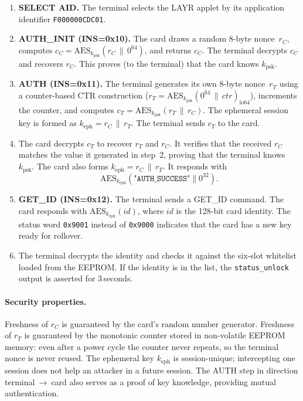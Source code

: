 \documentclass[manuscript,screen,nonacm]{acmart}
\begin{document}
\begin{enumerate}
  \item \textbf{SELECT AID.} The terminal selects the LAYR applet
        by its application identifier \texttt{F000000CDC01}.

  \item \textbf{AUTH\_INIT (INS=0x10).}
        The card draws a random 8-byte nonce~$r_C$, computes
        $c_C = \text{AES}_{k_\text{psk}}(r_C \,\|\, 0^{64})$, and
        returns $c_C$.
        The terminal decrypts $c_C$ and recovers $r_C$.
        This proves (to the terminal) that the card knows $k_\text{psk}$.

  \item \textbf{AUTH (INS=0x11).}
        The terminal generates its own 8-byte nonce~$r_T$ using a
        counter-based CTR construction
        ($r_T = \text{AES}_{k_\text{psk}}(0^{64}\,\|\,\mathit{ctr})_{\text{lo}64}$),
        increments the counter, and computes
        $c_T = \text{AES}_{k_\text{psk}}(r_T \,\|\, r_C)$.
        The ephemeral session key is formed as
        $k_\text{eph} = r_C \,\|\, r_T$.
        The terminal sends $c_T$ to the card.

  \item The card decrypts $c_T$ to recover $r_T$ and $r_C$.
        It verifies that the received $r_C$ matches the value it
        generated in step~2, proving that the terminal knows
        $k_\text{psk}$.
        The card also forms $k_\text{eph} = r_C \,\|\, r_T$.
        It responds with
        \[\text{AES}_{k_\text{eph}}(\texttt{"AUTH\_SUCCESS"} \| 0^{32}).\]

  \item \textbf{GET\_ID (INS=0x12).}
        The terminal sends a GET\_ID command.
        The card responds with $\text{AES}_{k_\text{eph}}(\mathit{id})$,
        where $\mathit{id}$ is the 128-bit card identity.
        The status word \texttt{0x9001} instead of \texttt{0x9000}
        indicates that the card has a new key ready for rollover.

  \item The terminal decrypts the identity and checks it against
        the six-slot whitelist loaded from the EEPROM.
        If the identity is in the list, the \texttt{status\_unlock}
        output is asserted for 3\,seconds.
\end{enumerate}

\paragraph{Security properties.}
Freshness of $r_C$ is guaranteed by the card's random number generator.
Freshness of $r_T$ is guaranteed by the monotonic counter stored in
non-volatile EEPROM memory: even after a power cycle the counter never
repeats, so the terminal nonce is never reused.
The ephemeral key $k_\text{eph}$ is session-unique; intercepting one
session does not help an attacker in a future session.
The AUTH step in direction terminal~→~card also serves as a proof of
key knowledge, providing mutual authentication.
\end{document}
